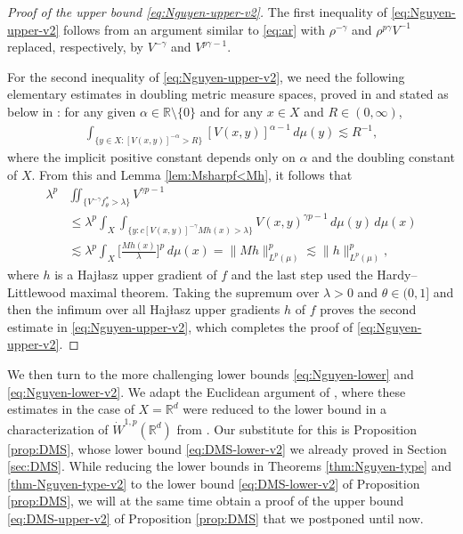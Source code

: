 \documentclass[11pt]{amsart}
\theoremstyle{definition}
\theoremstyle{remark}
\numberwithin{equation}{section}
\newcommand{\Norm}[2]{\|#1\|_{#2}}
\begin{document}
\begin{proof}[Proof of the upper bound \eqref{eq:Nguyen-upper-v2}]
The first inequality of \eqref{eq:Nguyen-upper-v2} follows from an argument
similar to \eqref{eq:ar} with $\rho^{-\gamma}$ and $\rho^{p\gamma}V^{-1}$ replaced,
respectively, by $V^{-\gamma}$ and $V^{p\gamma-1}$.

For the second inequality of \eqref{eq:Nguyen-upper-v2}, we need the following
elementary estimates in doubling metric measure spaces, proved in \cite[Lemma 2.8 and
p.~33]{DLYYZ:JFA} and stated as below in \cite[Lemma 3.2]{DLYYZ}:
for any given $\alpha\in\mathbb{R}\setminus\{0\}$ and
for any $x\in X$ and $R\in(0,\infty)$,
\begin{equation}\label{eq:ele}
\begin{split}
\int_{\{y\in X:[V(x,y)]^{-\alpha}>R\}}[V(x,y)]^{\alpha-1}\,d\mu(y)\lesssim R^{-1},
\end{split}
\end{equation}
where the implicit positive constant depends only on $\alpha$ and the doubling constant
of $X$. From this and Lemma \ref{lem:Msharpf<Mh}, it follows that
\begin{equation}
\begin{split}
\lambda^p &\iint_{\{V^{-\gamma}f_\theta^*>\lambda\}}V^{\gamma p-1} \\
&\leq\lambda^p\int_X \int_{ \{ y:c [V(x,y)]^{-\gamma}Mh(x) >\lambda \}}
V(x,y)^{\gamma p-1}\,d\mu(y)\,d\mu(x) \\
&\lesssim\lambda^p\int_X\Big[\frac{Mh(x)}{\lambda}\Big]^p\, d\mu(x)
=\Norm{Mh}{L^p(\mu)}^p\lesssim\Norm{h}{L^p(\mu)}^p,
\end{split}
\end{equation}
where $h$ is a Haj\l{}asz upper gradient of $f$ and the last step
used the Hardy--Littlewood maximal theorem.
Taking the supremum over $\lambda>0$ and $\theta\in(0,1]$
and then the infimum over all Haj\l{}asz upper gradients $h$ of $f$
proves the second estimate in \eqref{eq:Nguyen-upper-v2},
which completes the proof of \eqref{eq:Nguyen-upper-v2}.
\end{proof}

We then turn to the more challenging lower bounds \eqref{eq:Nguyen-lower}
and \eqref{eq:Nguyen-lower-v2}.
We adapt the Euclidean argument of \cite[Section 4]{BSVY},
where these estimates in the case of $X=\mathbb R^d$ were reduced
to the lower bound in a characterization of $\dot W^{1,p}(\mathbb R^d)$ from \cite{BBM}.
Our substitute for this is Proposition \ref{prop:DMS}, whose lower bound
\eqref{eq:DMS-lower-v2} we already proved in Section \ref{sec:DMS}.
While reducing the lower bounds in Theorems \ref{thm:Nguyen-type} and
\ref{thm-Nguyen-type-v2} to the lower  bound \eqref{eq:DMS-lower-v2}  of Proposition
\ref{prop:DMS}, we will at the same time obtain a proof of the upper bound
\eqref{eq:DMS-upper-v2}  of Proposition \ref{prop:DMS} that we postponed until now.
\end{document}
